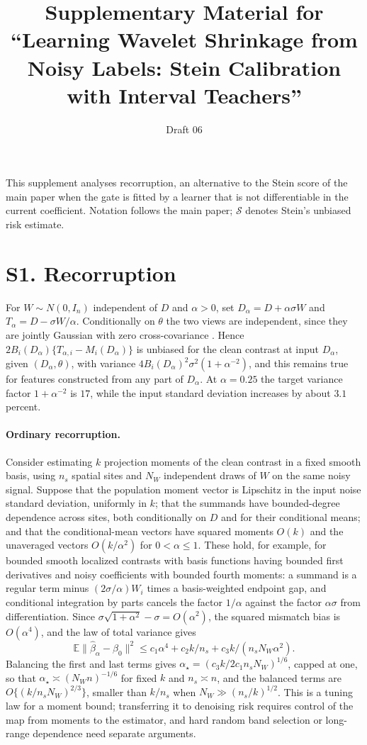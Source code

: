 \documentclass[11pt]{article}
\title{Supplementary Material for ``Learning Wavelet Shrinkage from Noisy Labels:
Stein Calibration with Interval Teachers''}
\author{}\date{Draft 06}
\theoremstyle{plain}\newtheorem{proposition}{Proposition}
\newcommand{\E}{\mathbb E}
\begin{document}
\maketitle
\noindent This supplement analyses recorruption, an alternative to the Stein score of the main
paper when the gate is fitted by a learner that is not differentiable in the current
coefficient. Notation follows the main paper; $\mathcal S$ denotes Stein's unbiased risk estimate.

\section*{S1. Recorruption}

For $W\sim N(0,I_n)$ independent of $D$ and $\alpha>0$, set $D_\alpha=D+\alpha\sigma W$ and
$T_\alpha=D-\sigma W/\alpha$. Conditionally on $\theta$ the two views are independent, since they are
jointly Gaussian with zero cross-covariance \citep{pang2021recorrupted}. Hence
$2B_i(D_\alpha)\{T_{\alpha,i}-M_i(D_\alpha)\}$ is unbiased for the clean contrast at input $D_\alpha$, given
$(D_\alpha,\theta)$, with variance $4B_i(D_\alpha)^2\sigma^2(1+\alpha^{-2})$, and this remains true for
features constructed from any part of $D_\alpha$. At $\alpha=0.25$ the target variance factor
$1+\alpha^{-2}$ is $17$, while the input standard deviation increases by about $3.1$ percent.

\paragraph{Ordinary recorruption.} Consider estimating $k$ projection moments of the clean
contrast in a fixed smooth basis, using $n_s$ spatial sites and $N_W$ independent draws of $W$ on
the same noisy signal. Suppose that the population moment vector is Lipschitz in the input
noise standard deviation, uniformly in $k$; that the summands have bounded-degree dependence
across sites, both conditionally on $D$ and for their conditional means; and that the
conditional-mean vectors have squared moments $O(k)$ and the unaveraged vectors $O(k/\alpha^2)$
for $0<\alpha\le1$. These hold, for example, for bounded smooth localized contrasts with basis
functions having bounded first derivatives and noisy coefficients with bounded fourth
moments: a summand is a regular term minus $(2\sigma/\alpha)W_i$ times a basis-weighted endpoint
gap, and conditional integration by parts cancels the factor $1/\alpha$ against the factor $\alpha\sigma$
from differentiation. Since $\sigma\sqrt{1+\alpha^2}-\sigma=O(\alpha^2)$, the squared mismatch bias is
$O(\alpha^4)$, and the law of total variance gives
$$
\E\|\widehat\beta_\alpha-\beta_0\|^2\le c_1\alpha^4+c_2k/n_s+c_3k/(n_sN_W\alpha^2).
$$
Balancing the first and last terms gives $\alpha_\star=(c_3k/2c_1n_sN_W)^{1/6}$, capped at one, so
that $\alpha_\star\asymp(N_Wn)^{-1/6}$ for fixed $k$ and $n_s\asymp n$, and the balanced terms are
$O\{(k/n_sN_W)^{2/3}\}$, smaller than $k/n_s$ when $N_W\gg(n_s/k)^{1/2}$. This is a tuning law for a
moment bound; transferring it to denoising risk requires control of the map from moments to
the estimator, and hard random band selection or long-range dependence need separate
arguments.
\end{document}
